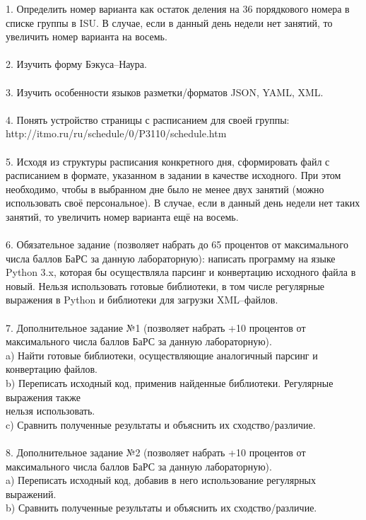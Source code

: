 \documentclass[12pt]{article}
\begin{document}
1. Определить номер варианта как остаток деления на 36 порядкового номера в списке группы в ISU. В случае, если в данный день недели нет занятий, то увеличить номер варианта на восемь.\\
\\
2. Изучить форму Бэкуса--Наура.\\
\\
3. Изучить особенности языков разметки/форматов JSON, YAML, XML.\\
\\
4. Понять устройство страницы с расписанием для своей группы:\\
http://itmo.ru/ru/schedule/0/P3110/schedule.htm\\
\\
5. Исходя из структуры расписания конкретного дня, сформировать файл с расписанием в формате, указанном в задании в качестве исходного. При этом необходимо, чтобы в выбранном дне было не менее двух занятий (можно использовать своё персональное). В случае, если в данный день недели нет таких занятий, то увеличить номер варианта ещё на восемь.\\
\\
6. Обязательное задание (позволяет набрать до 65 процентов от максимального числа баллов БаРС за данную лабораторную): написать программу на языке Python 3.x, которая бы осуществляла парсинг и конвертацию исходного файла в новый. Нельзя использовать готовые библиотеки, в том числе регулярные выражения в Python и библиотеки для загрузки XML--файлов.\\
\\
7. Дополнительное задание №1 (позволяет набрать +10 процентов от максимального числа баллов БаРС за данную лабораторную).\\
\indent a) Найти готовые библиотеки, осуществляющие аналогичный парсинг и конвертацию файлов.\\
\indent b) Переписать исходный код, применив найденные библиотеки. Регулярные выражения также\\ нельзя использовать.\\
\indent c) Сравнить полученные результаты и объяснить их сходство/различие.\\
\\
8. Дополнительное задание №2 (позволяет набрать +10 процентов от максимального числа баллов БаРС за данную лабораторную).\\
\indent a) Переписать исходный код, добавив в него использование регулярных выражений.\\
\indent b) Сравнить полученные результаты и объяснить их сходство/различие.\\
\end{document}

